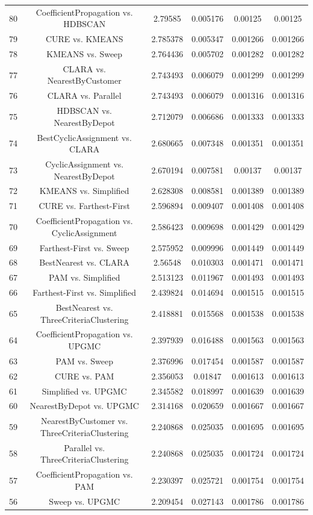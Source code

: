 \documentclass[a4paper,10pt]{article}
\begin{document}
\begin{landscape}
\begin{table}[!htp]
\begin{tabular}{cccccc}
80&CoefficientPropagation vs. HDBSCAN&2.79585&0.005176&0.00125&0.00125\\
79&CURE vs. KMEANS&2.785378&0.005347&0.001266&0.001266\\
78&KMEANS vs. Sweep&2.764436&0.005702&0.001282&0.001282\\
77&CLARA vs. NearestByCustomer&2.743493&0.006079&0.001299&0.001299\\
76&CLARA vs. Parallel&2.743493&0.006079&0.001316&0.001316\\
75&HDBSCAN vs. NearestByDepot&2.712079&0.006686&0.001333&0.001333\\
74&BestCyclicAssignment vs. CLARA&2.680665&0.007348&0.001351&0.001351\\
73&CyclicAssignment vs. NearestByDepot&2.670194&0.007581&0.00137&0.00137\\
72&KMEANS vs. Simplified&2.628308&0.008581&0.001389&0.001389\\
71&CURE vs. Farthest-First&2.596894&0.009407&0.001408&0.001408\\
70&CoefficientPropagation vs. CyclicAssignment&2.586423&0.009698&0.001429&0.001429\\
69&Farthest-First vs. Sweep&2.575952&0.009996&0.001449&0.001449\\
68&BestNearest vs. CLARA&2.56548&0.010303&0.001471&0.001471\\
67&PAM vs. Simplified&2.513123&0.011967&0.001493&0.001493\\
66&Farthest-First vs. Simplified&2.439824&0.014694&0.001515&0.001515\\
65&BestNearest vs. ThreeCriteriaClustering&2.418881&0.015568&0.001538&0.001538\\
64&CoefficientPropagation vs. UPGMC&2.397939&0.016488&0.001563&0.001563\\
63&PAM vs. Sweep&2.376996&0.017454&0.001587&0.001587\\
62&CURE vs. PAM&2.356053&0.01847&0.001613&0.001613\\
61&Simplified vs. UPGMC&2.345582&0.018997&0.001639&0.001639\\
60&NearestByDepot vs. UPGMC&2.314168&0.020659&0.001667&0.001667\\
59&NearestByCustomer vs. ThreeCriteriaClustering&2.240868&0.025035&0.001695&0.001695\\
58&Parallel vs. ThreeCriteriaClustering&2.240868&0.025035&0.001724&0.001724\\
57&CoefficientPropagation vs. PAM&2.230397&0.025721&0.001754&0.001754\\
56&Sweep vs. UPGMC&2.209454&0.027143&0.001786&0.001786\\

\end{tabular}
\end{table}
\end{landscape}
\end{document}

